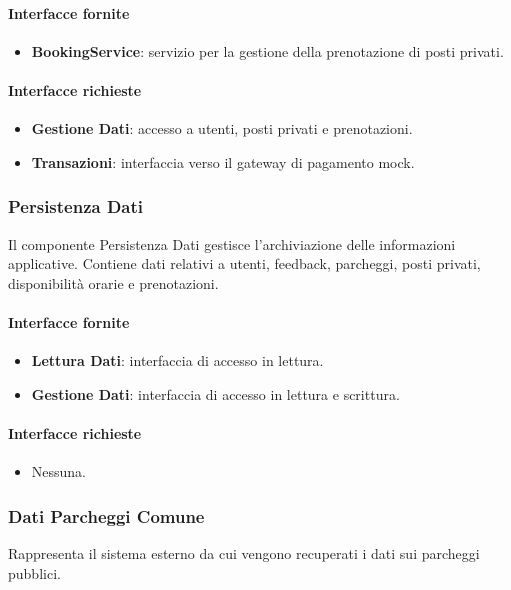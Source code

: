 \documentclass[12pt,a4paper]{article}
\begin{document}
\paragraph{Interfacce fornite}
\begin{itemize}
    \item \textbf{BookingService}: servizio per la gestione della prenotazione di posti privati.
\end{itemize}

\paragraph{Interfacce richieste}
\begin{itemize}
    \item \textbf{Gestione Dati}: accesso a utenti, posti privati e prenotazioni.
    \item \textbf{Transazioni}: interfaccia verso il gateway di pagamento mock.
\end{itemize}

\subsubsection{Persistenza Dati}
Il componente Persistenza Dati gestisce l’archiviazione delle informazioni applicative. Contiene dati relativi a utenti, feedback, parcheggi, posti privati, disponibilità orarie e prenotazioni.

\paragraph{Interfacce fornite}
\begin{itemize}
    \item \textbf{Lettura Dati}: interfaccia di accesso in lettura.
    \item \textbf{Gestione Dati}: interfaccia di accesso in lettura e scrittura.
\end{itemize}

\paragraph{Interfacce richieste}
\begin{itemize}
    \item Nessuna.
\end{itemize}

\subsubsection{Dati Parcheggi Comune}
Rappresenta il sistema esterno da cui vengono recuperati i dati sui parcheggi pubblici.
\end{document}
